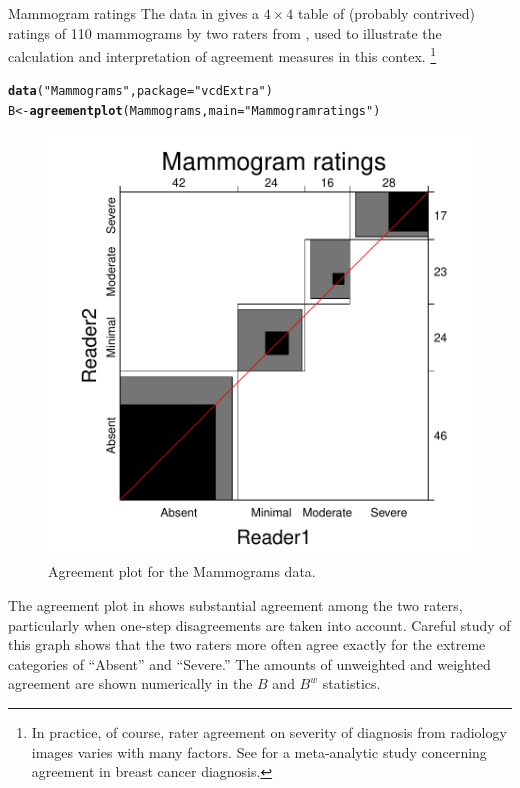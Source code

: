 \documentclass[11pt]{book}\usepackage[]{graphicx}\usepackage[]{color}
\makeatletter
\newcommand{\hlstr}[1]{\textcolor[rgb]{0.192,0.494,0.8}{#1}}%
\newcommand{\hlstd}[1]{\textcolor[rgb]{0.345,0.345,0.345}{#1}}%
\newcommand{\hlkwb}[1]{\textcolor[rgb]{0.69,0.353,0.396}{#1}}%
\newcommand{\hlkwc}[1]{\textcolor[rgb]{0.333,0.667,0.333}{#1}}%
\newcommand{\hlkwd}[1]{\textcolor[rgb]{0.737,0.353,0.396}{\textbf{#1}}}%
\newenvironment{kframe}{%
 \def\at@end@of@kframe{}%
 \ifinner\ifhmode%
  \def\at@end@of@kframe{\end{minipage}}%
  \begin{minipage}{\columnwidth}%
 \fi\fi%
 \def\FrameCommand##1{\hskip\@totalleftmargin \hskip-\fboxsep
 \colorbox{shadecolor}{##1}\hskip-\fboxsep
     \hskip-\linewidth \hskip-\@totalleftmargin \hskip\columnwidth}%
 \MakeFramed {\advance\hsize-\width
   \@totalleftmargin\z@ \linewidth\hsize
   \@setminipage}}%
 {\par\unskip\endMakeFramed%
 \at@end@of@kframe}
\newenvironment{knitrout}{}{} %
\renewenvironment{knitrout}{\small\renewcommand{\baselinestretch}{.85}}{} %
\makeatother
\begin{document}
\begin{Example}[mammograms]{Mammogram ratings}
The  data in  gives a $4 \times 4$ table
of (probably contrived) ratings of 110 mammograms by two raters from
\citet{KundelPolansky:2003}, used to illustrate the calculation
and interpretation of agreement measures in this contex.%
\footnote{
In practice, of course, rater agreement on severity of diagnosis from
radiology images varies with many factors.  See \citet{AntonioCrespi:2010}
for a meta-analytic study concerning agreement in breast cancer diagnosis.
}

\begin{knitrout}
\color{fgcolor}\begin{kframe}
\begin{alltt}
\hlkwd{data}\hlstd{(}\hlstr{"Mammograms"}\hlstd{,} \hlkwc{package}\hlstd{=}\hlstr{"vcdExtra"}\hlstd{)}
\hlstd{B} \hlkwb{<-} \hlkwd{agreementplot}\hlstd{(Mammograms,} \hlkwc{main}\hlstd{=}\hlstr{"Mammogram ratings"}\hlstd{)}
\end{alltt}
\end{kframe}\begin{figure}[htbp]


\centerline{\includegraphics[width=.6\textwidth]{ch04/fig/mammograms1} }

\caption[Agreement plot for the Mammograms data]{Agreement plot for the Mammograms data.\label{fig:mammograms1}}
\end{figure}


\end{knitrout}

The agreement plot in  shows substantial agreement
among the two raters, particularly when one-step disagreements are taken into
account.  Careful study of this graph shows that the two raters more often
agree exactly for the extreme categories of ``Absent'' and ``Severe.''
The amounts of unweighted and weighted
agreement are shown numerically in the $B$ and $B^w$
statistics.


\end{Example}
\end{document}
